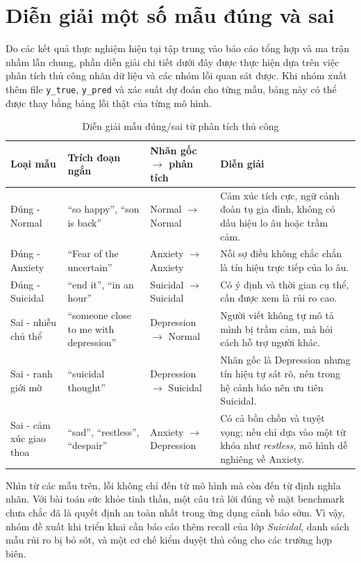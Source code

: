 \documentclass[12pt,a4paper,oneside]{report}
\newlength{\manualparindent}
\newcommand{\manualindent}{\hspace*{\manualparindent}}
\begin{document}
\section{Diễn giải một số mẫu đúng và sai}

\manualindent%
Do các kết quả thực nghiệm hiện tại tập trung vào báo cáo tổng hợp và ma trận nhầm lẫn chung, phần diễn giải chi tiết dưới đây được thực hiện dựa trên việc phân tích thủ công nhãn dữ liệu và các nhóm lỗi quan sát được. Khi nhóm xuất thêm file \texttt{y\_true}, \texttt{y\_pred} và xác suất dự đoán cho từng mẫu, bảng này có thể được thay bằng bảng lỗi thật của từng mô hình.

\begin{table}[H]
  \centering
  \caption{Diễn giải mẫu đúng/sai từ phân tích thủ công}
  \label{tab:correct-wrong-examples}
  \small
  \begin{tabularx}{\textwidth}{p{2.6cm}p{3.5cm}p{2.4cm}X}
    \toprule
    Loại mẫu & Trích đoạn ngắn & Nhãn gốc $\rightarrow$ phân tích & Diễn giải \\
    \midrule
    Đúng - Normal & ``so happy'', ``son is back'' & Normal $\rightarrow$ Normal & Cảm xúc tích cực, ngữ cảnh đoàn tụ gia đình, không có dấu hiệu lo âu hoặc trầm cảm. \\
    Đúng - Anxiety & ``Fear of the uncertain'' & Anxiety $\rightarrow$ Anxiety & Nỗi sợ điều không chắc chắn là tín hiệu trực tiếp của lo âu. \\
    Đúng - Suicidal & ``end it'', ``in an hour'' & Suicidal $\rightarrow$ Suicidal & Có ý định và thời gian cụ thể, cần được xem là rủi ro cao. \\
    Sai - nhiễu chủ thể & ``someone close to me with depression'' & Depression $\rightarrow$ Normal & Người viết không tự mô tả mình bị trầm cảm, mà hỏi cách hỗ trợ người khác. \\
    Sai - ranh giới mờ & ``suicidal thought'' & Depression $\rightarrow$ Suicidal & Nhãn gốc là Depression nhưng tín hiệu tự sát rõ, nên trong hệ cảnh báo nên ưu tiên Suicidal. \\
    Sai - cảm xúc giao thoa & ``sad'', ``restless'', ``despair'' & Anxiety $\rightarrow$ Depression & Có cả bồn chồn và tuyệt vọng; nếu chỉ dựa vào một từ khóa như \textit{restless}, mô hình dễ nghiêng về Anxiety. \\
    \bottomrule
  \end{tabularx}
\end{table}

\manualindent%
Nhìn từ các mẫu trên, lỗi không chỉ đến từ mô hình mà còn đến từ định nghĩa nhãn. Với bài toán sức khỏe tinh thần, một câu trả lời đúng về mặt benchmark chưa chắc đã là quyết định an toàn nhất trong ứng dụng cảnh báo sớm. Vì vậy, nhóm đề xuất khi triển khai cần báo cáo thêm recall của lớp \textit{Suicidal}, danh sách mẫu rủi ro bị bỏ sót, và một cơ chế kiểm duyệt thủ công cho các trường hợp biên.
\end{document}
